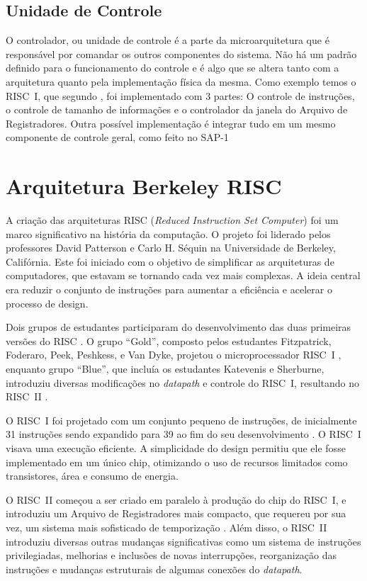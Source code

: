 \documentclass[
	12pt,				%
	openright,			%
	oneside,			%
	a4paper,			%
	english,			%
	french,				%
	spanish,			%
	brazil,				%
	]{abntex2}
\begin{document}
\subsection{Unidade de Controle}\label{sec:control}
O controlador, ou unidade de controle é a parte da microarquitetura que é responsável por comandar os outros componentes do sistema. Não há um padrão definido para o funcionamento do controle e é algo que se altera tanto com a arquitetura quanto pela implementação física da mesma. Como exemplo temos o RISC~I, que segundo , foi implementado com 3 partes: O controle de instruções, o controle de tamanho de informações e o controlador da janela do Arquivo de Registradores. Outra possível implementação é integrar tudo em um mesmo componente de controle geral, como feito no SAP-1\cite{malvino_digital_1993}

\section{Arquitetura Berkeley RISC}
A criação das arquiteturas RISC (\textit{Reduced Instruction Set Computer}) foi um marco significativo na história da computação. O projeto foi liderado pelos professores David Patterson e Carlo H. Séquin na Universidade de Berkeley, Califórnia. Este foi iniciado com o objetivo de simplificar as arquiteturas de computadores, que estavam se tornando cada vez mais complexas. A ideia central era reduzir o conjunto de instruções para aumentar a eficiência e acelerar o processo de design.

Dois grupos de estudantes participaram do desenvolvimento das duas primeiras versões do RISC \cite{daniel_t_fitzpatrick_riscy_1982}. O grupo “Gold”, composto pelos estudantes Fitzpatrick, Foderaro, Peek, Peshkess, e Van Dyke, projetou o microprocessador RISC~I \cite{peek_vlsi_1983}, enquanto grupo “Blue”, que incluía os estudantes Katevenis e Sherburne, introduziu diversas modificações no \textit{datapath} e controle do RISC~I, resultando no RISC~II \cite{katevenis_reduced_1985}.

O RISC~I foi projetado com um conjunto pequeno de instruções, de inicialmente 31 instruções sendo expandido para 39 ao fim do seu desenvolvimento \cite{patterson_design_1982}. O RISC~I visava uma execução eficiente. A simplicidade do design permitiu que ele fosse implementado em um único chip, otimizando o uso de recursos limitados como transistores, área e consumo de energia.

O RISC~II começou a ser criado em paralelo à produção do chip do RISC~I, e introduziu um Arquivo de Registradores mais compacto, que requereu por sua vez, um sistema mais sofisticado de temporização \cite{patterson_design_1982}. Além disso, o RISC~II introduziu diversas outras mudanças significativas como um sistema de instruções privilegiadas, melhorias e inclusões de novas interrupções, reorganização das instruções e mudanças estruturais de algumas conexões do \textit{datapath}.
\end{document}
